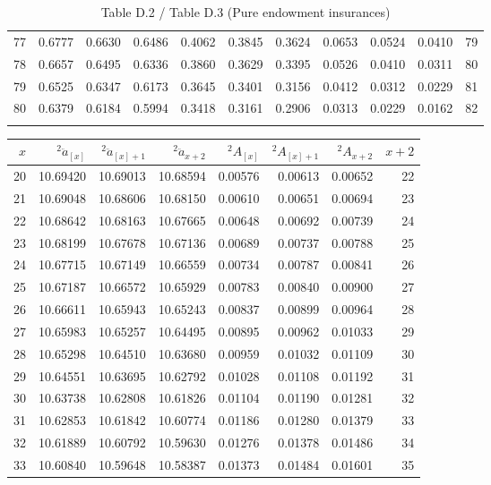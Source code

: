 \documentclass[12pt]{article}
\begin{document}
\begin{longtable}{rrrrrrrrrrr}
  77 & 0.6777 & 0.6630 & 0.6486 & 0.4062 & 0.3845 & 0.3624 & 0.0653 & 0.0524 & 0.0410 & 79 \\ 
  78 & 0.6657 & 0.6495 & 0.6336 & 0.3860 & 0.3629 & 0.3395 & 0.0526 & 0.0410 & 0.0311 & 80 \\ 
  79 & 0.6525 & 0.6347 & 0.6173 & 0.3645 & 0.3401 & 0.3156 & 0.0412 & 0.0312 & 0.0229 & 81 \\ 
  80 & 0.6379 & 0.6184 & 0.5994 & 0.3418 & 0.3161 & 0.2906 & 0.0313 & 0.0229 & 0.0162 & 82 \\ 
  \hline
\caption{Table D.2 / Table D.3 (Pure endowment insurances)} 
\end{longtable}%
\begin{longtable}{rrrrrrrr}
  \hline
$x$ & ${}^{2}\ddot{a}_{[x]}$ & ${}^{2}\ddot{a}_{[x]+1}$ & ${}^{2}\ddot{a}_{x+2}$ & ${}^{2}A_{[x]}$ & ${}^{2}A_{[x]+1}$ & ${}^{2}A_{x+2}$ & $x+2$ \\ 
  \hline \endhead 20 & 10.69420 & 10.69013 & 10.68594 & 0.00576 & 0.00613 & 0.00652 & 22 \\ 
  21 & 10.69048 & 10.68606 & 10.68150 & 0.00610 & 0.00651 & 0.00694 & 23 \\ 
  22 & 10.68642 & 10.68163 & 10.67665 & 0.00648 & 0.00692 & 0.00739 & 24 \\ 
  23 & 10.68199 & 10.67678 & 10.67136 & 0.00689 & 0.00737 & 0.00788 & 25 \\ 
  24 & 10.67715 & 10.67149 & 10.66559 & 0.00734 & 0.00787 & 0.00841 & 26 \\ 
  25 & 10.67187 & 10.66572 & 10.65929 & 0.00783 & 0.00840 & 0.00900 & 27 \\ 
  26 & 10.66611 & 10.65943 & 10.65243 & 0.00837 & 0.00899 & 0.00964 & 28 \\ 
  27 & 10.65983 & 10.65257 & 10.64495 & 0.00895 & 0.00962 & 0.01033 & 29 \\ 
  28 & 10.65298 & 10.64510 & 10.63680 & 0.00959 & 0.01032 & 0.01109 & 30 \\ 
  29 & 10.64551 & 10.63695 & 10.62792 & 0.01028 & 0.01108 & 0.01192 & 31 \\ 
  30 & 10.63738 & 10.62808 & 10.61826 & 0.01104 & 0.01190 & 0.01281 & 32 \\ 
  31 & 10.62853 & 10.61842 & 10.60774 & 0.01186 & 0.01280 & 0.01379 & 33 \\ 
  32 & 10.61889 & 10.60792 & 10.59630 & 0.01276 & 0.01378 & 0.01486 & 34 \\ 
  33 & 10.60840 & 10.59648 & 10.58387 & 0.01373 & 0.01484 & 0.01601 & 35 \\ 

\end{longtable}
\end{document}
